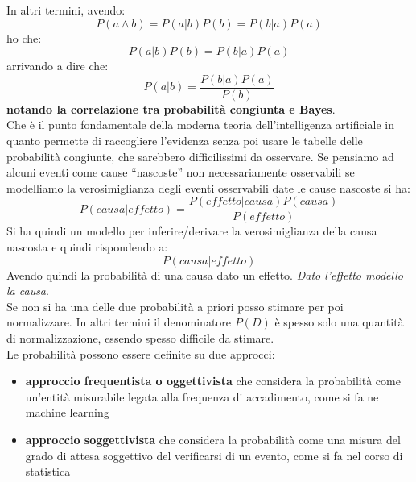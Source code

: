 \documentclass[a4paper,12pt, oneside]{book}
\begin{document}
In altri termini, avendo:
\[P(a\land b)=P(a|b)P(b)=P(b|a)P(a)\]
ho che:
\[P(a|b)P(b)=P(b|a)P(a)\]
arrivando a dire che:
\[P(a|b)=\frac{P(b|a)P(a)}{P(b)}\]
\textbf{notando la correlazione tra probabilità congiunta e Bayes}.\\
Che è il punto fondamentale della moderna teoria dell'intelligenza artificiale
in quanto permette di raccogliere l'evidenza senza poi usare le tabelle delle
probabilità congiunte, che sarebbero difficilissimi da osservare.
Se pensiamo ad alcuni eventi come cause ``nascoste'' non necessariamente
osservabili se modelliamo la verosimiglianza degli eventi osservabili date le
cause nascoste si ha:
\[P(causa|effetto)=\frac{P(effetto|causa)P(causa)}{P(effetto)}\]
Si ha quindi un modello per inferire/derivare la verosimiglianza della causa
nascosta e quindi rispondendo a:
\[P(causa|effetto)\]
Avendo quindi la probabilità di una causa dato un effetto.
\textit{Dato l'effetto modello la causa}.\\
Se non si ha una delle due probabilità a priori posso stimare per poi
normalizzare. In altri termini il denominatore $P(D)$ è spesso solo una quantità
di normalizzazione, essendo spesso difficile da stimare. \\
Le probabilità possono essere definite su due approcci:
\begin{itemize}
  \item \textbf{approccio frequentista o oggettivista} che considera la
  probabilità come un'entità misurabile legata alla frequenza di accadimento,
  come si fa ne machine learning
  \item \textbf{approccio soggettivista} che considera la
  probabilità come una misura del grado di attesa soggettivo del verificarsi di
  un evento, come si fa nel corso di statistica
\end{itemize}
\end{document}
